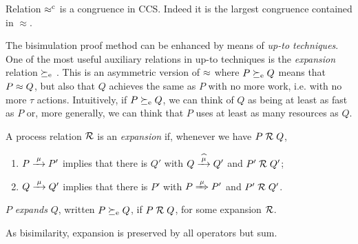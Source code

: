 \begin{theorem}
\label{t:rapproxCongruence}
Relation $\mathrel{\approx^{\rm{c}}}$ is a congruence in CCS.  Indeed it is the
largest congruence contained in $\approx$.
\end{theorem}  


The bisimulation proof method can be enhanced by means of \emph{up-to
  techniques}. One of the most useful auxiliary relations in up-to
techniques  is the \emph{expansion} relation  $\mathrel{\succeq_{\rm{e}}}$ \cite{SaMi92}. This is an asymmetric version
of $\approx$ where $P \mathrel{\succeq_{\rm{e}}} Q$  means that 
 $P \approx Q$,
but also that $Q$  achieves  the same as  $P$ 
with  no more work, i.e. with no more $\tau$ actions.
Intuitively, if $ P \mathrel{\succeq_{\rm{e}}} Q$, we can think of $Q$ as being 
at least as fast as $P$
or, more generally, we can think that $P$  uses at least as many resources as $Q$.

\begin{definition}[expansion]
\label{d:expa}
A process relation ${{\cal R}}$ 
 is an {\em  expansion} if, whenever
we have $P\mathrel{\cal R} Q$, %
\begin{enumerate}
\item   $P \arr\mu P'$ implies that there is $Q'$ with $Q \arcap \mu
  Q'$
 and $P' \mathrel{\cal R} Q'$;
\item 
    $Q \arr\mu Q'$   implies that there is $P'$ with $P \Arr \mu
 P'$ and $P' 
\mathrel{\cal R} Q'$.
\end{enumerate}
 $P$  {\em expands} $Q$, written
$P  \mathrel{\succeq_{\rm{e}}} Q$, 
if $P \mathrel{\cal R} Q$,  for some expansion ${\cal R}$. 
\end{definition}

As bisimilarity, expansion is preserved by all operators but sum.
